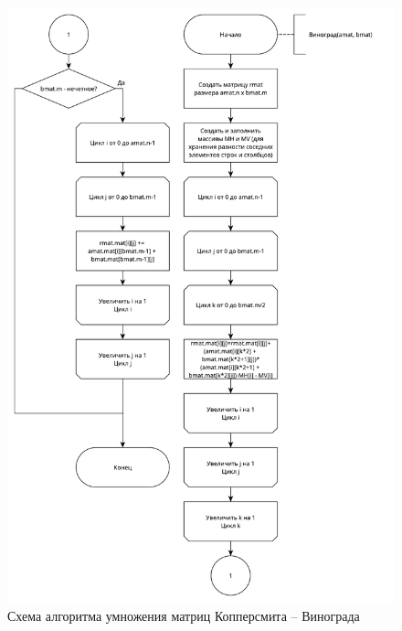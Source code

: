 \begin{figure}[ht!]
	\centering
	\includegraphics[width=0.90\linewidth]{assets/mtx-win1.pdf}
	\caption{Схема алгоритма умножения матриц Копперсмита -- Винограда}
	\label{fig:win-1}
\end{figure}

